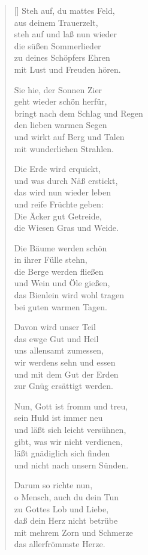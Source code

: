 \begin{multicols}{2}
\begin{verse}[\versewidth]
 Steh auf, du mattes Feld,\\
aus deinem Trauerzelt,\\
steh auf und laß nun wieder\\
die süßen Sommerlieder\\
zu deines Schöpfers Ehren\\
mit Lust und Freuden hören.

 Sie hie, der Sonnen Zier\\
geht wieder schön herfür,\\
bringt nach dem Schlag und Regen\\
den lieben warmen Segen\\
und wirkt auf Berg und Talen\\
mit wunderlichen Strahlen.

 Die Erde wird erquickt,\\
und was durch Näß erstickt,\\
das wird nun wieder leben\\
und reife Früchte geben:\\
Die Äcker gut Getreide,\\
die Wiesen Gras und Weide.

 Die Bäume werden schön\\
in ihrer Fülle stehn,\\
die Berge werden fließen\\
und Wein und Öle gießen,\\
das Bienlein wird wohl tragen\\
bei guten warmen Tagen.

 Davon wird unser Teil\\
das ewge Gut und Heil\\
uns allensamt zumessen,\\
wir werdens sehn und essen\\
und mit dem Gut der Erden\\
zur Gnüg ersättigt werden.

 Nun, Gott ist fromm und treu,\\
sein Huld ist immer neu\\
und läßt sich leicht versühnen,\\
gibt, was wir nicht verdienen,\\
läßt gnädiglich sich finden\\
und nicht nach unsern Sünden.

 Darum so richte nun,\\
o Mensch, auch du dein Tun\\
zu Gottes Lob und Liebe,\\
daß dein Herz nicht betrübe\\
mit mehrem Zorn und Schmerze\\
das allerfrömmste Herze.
   
\end{verse}
\end{multicols}
